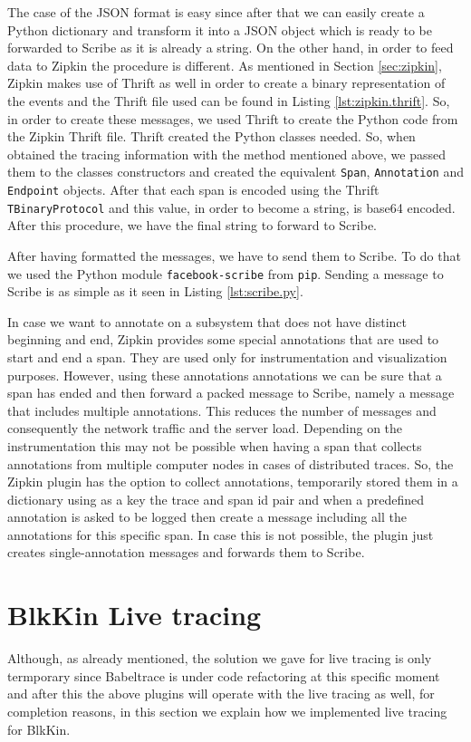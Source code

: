 The case of the JSON format is easy since after that we can easily create a
Python dictionary and transform it into a JSON object which is ready to be
forwarded to Scribe as it is already a string. On the other hand, in order to
feed data to Zipkin the procedure is different. As mentioned in Section
\ref{sec:zipkin}, Zipkin makes use of Thrift as well in order to create a binary
representation of the events and the Thrift file used can be found in Listing
\ref{lst:zipkin.thrift}. So, in order to create these messages, we used Thrift
to create the Python code from the Zipkin Thrift file. Thrift created the Python
classes needed. So, when obtained the tracing information with the method
mentioned above, we passed them to the classes constructors and created the
equivalent \texttt{Span}, \texttt{Annotation} and \texttt{Endpoint} objects.
After that each span is encoded using the Thrift \texttt{TBinaryProtocol} and
this value, in order to become a string, is base64 encoded. After this
procedure, we have the final string to forward to Scribe.

After having formatted the messages, we have to send them to Scribe. To do that
we used the Python module \texttt{facebook-scribe} from \texttt{pip}. Sending a
message to Scribe is as simple as it seen in Listing \ref{lst:scribe.py}.


In case we want to annotate on a subsystem that does not have distinct beginning
and end, Zipkin provides some special annotations that are used to start and end
a span. They are used only for instrumentation and visualization purposes.
However, using these annotations annotations we can be sure that a span has
ended and then forward a packed message to Scribe, namely a message that
includes multiple annotations. This reduces the number of messages and
consequently the network traffic and the server load. Depending on the
instrumentation this may not be possible when having a span that collects
annotations from multiple computer nodes in cases of distributed traces. So, the
Zipkin plugin has the option to collect annotations, temporarily stored them in
a dictionary using as a key the trace and span id pair and when a predefined
annotation is asked to be logged then create a message including all the
annotations for this specific span. In case this is not possible, the plugin
just creates single-annotation messages and forwards them to Scribe.

\section{BlkKin Live tracing}
Although, as already mentioned, the solution we gave for live tracing is only
termporary since Babeltrace is under code refactoring at this specific moment
and after this the above plugins will operate with the live tracing as well, for
completion reasons, in this section we explain how we implemented live tracing
for BlkKin.

